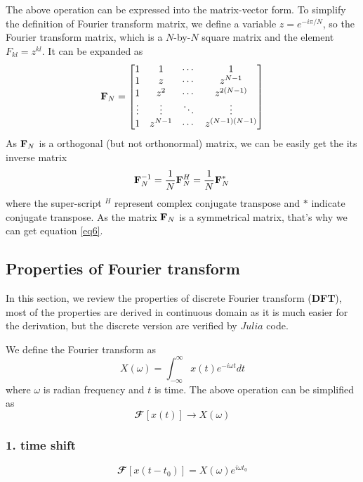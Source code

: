\documentclass[revised,endfloat]{geophysics}
\begin{document}
The above operation can be expressed into the matrix-vector form. To simplify the definition of Fourier transform matrix, we define a variable $z = e^{-i \pi  / N}$, so the Fourier transform matrix, which is a $N$-by-$N$ square matrix and the element $F_{kl} = z^{kl}$. It can be expanded as
\begin{equation}
{\bf F}_N = \begin{bmatrix}
1 & 1 & \cdots & 1 \\
1 & z & \cdots & z^{N-1} \\
1 & z^2 & \cdots & z^{2(N-1)} \\
\vdots & \vdots & \ddots & \vdots \\
1 & z^{N-1} & \cdots & z^{(N-1)(N-1)} \\
\end{bmatrix}
\label{eq5}
\end{equation}
As ${\bf F}_N$ is a orthogonal (but not orthonormal) matrix, we can be easily get the its inverse matrix
\begin{equation}
{\bf F}_N^{-1} = \frac{1}{N} {\bf F}_N^H = \frac{1}{N} {\bf F}_N^{\ast} \,
\label{eq6}
\end{equation}
where the super-script $^H$ represent complex conjugate transpose and $\ast$ indicate conjugate transpose. As the matrix ${\bf F}_N$ is a symmetrical matrix, that's why we can get equation \ref{eq6}.

\subsection{Properties of Fourier transform}

In this section, we review the properties of discrete Fourier transform ({\bf DFT}), most of the properties are derived in continuous domain as it is much easier for the derivation, but the discrete version are verified by $Julia$ code.

We define the Fourier transform as
\begin{equation}
X(\omega) = \int_{-\infty}^{\infty} x(t) e^{-i\omega t} dt
\end{equation}
where $\omega$ is radian frequency and $t$ is time. The above operation can be simplified as 
\begin{equation}
{\mathbfcal F}[x(t)] \rightarrow X(\omega)
\end{equation}

\subsubsection{1. time shift}
\begin{equation}
{\mathbfcal F}[x(t-t_0)] = X(\omega)e^{i \omega t_0}
\end{equation}
\end{document}
